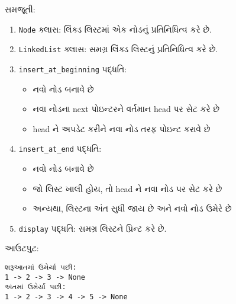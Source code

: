 \begin{Shaded}
\begin{Highlighting}[]
\NormalTok{(}\NormalTok{)}

\NormalTok{)}
\NormalTok{)}

\NormalTok{(}\NormalTok{)}
\end{Highlighting}
\end{Shaded}

સમજૂતી:

\begin{enumerate}
\def\labelenumi{\arabic{enumi}.}
\item
  \texttt{Node} ક્લાસ: લિંક્ડ લિસ્ટમાં એક નોડનું પ્રતિનિધિત્વ કરે છે.
\item
  \texttt{LinkedList} ક્લાસ: સમગ્ર લિંક્ડ લિસ્ટનું પ્રતિનિધિત્વ કરે છે.
\item
  \texttt{insert\_at\_beginning} પદ્ધતિ:

  \begin{itemize}
  \tightlist
  \item
    નવો નોડ બનાવે છે
  \item
    નવા નોડના next પોઇન્ટરને વર્તમાન head પર સેટ કરે છે
  \item
    head ને અપડેટ કરીને નવા નોડ તરફ પોઇન્ટ કરાવે છે
  \end{itemize}
\item
  \texttt{insert\_at\_end} પદ્ધતિ:

  \begin{itemize}
  \tightlist
  \item
    નવો નોડ બનાવે છે
  \item
    જો લિસ્ટ ખાલી હોય, તો head ને નવા નોડ પર સેટ કરે છે
  \item
    અન્યથા, લિસ્ટના અંત સુધી જાય છે અને નવો નોડ ઉમેરે છે
  \end{itemize}
\item
  \texttt{display} પદ્ધતિ: સમગ્ર લિસ્ટને પ્રિન્ટ કરે છે.
\end{enumerate}

આઉટપુટ:

\begin{verbatim}
શરૂઆતમાં ઉમેર્યા પછી:
1 -> 2 -> 3 -> None
અંતમાં ઉમેર્યા પછી:
1 -> 2 -> 3 -> 4 -> 5 -> None
\end{verbatim}

\begin{Shaded}
\begin{Highlighting}[]
\end{Highlighting}
\end{Shaded}

